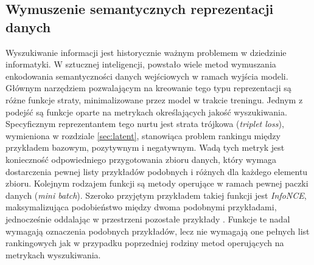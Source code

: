 \subsection{Wymuszenie semantycznych reprezentacji danych}
Wyszukiwanie informacji jest historycznie ważnym problemem w dziedzinie informatyki. W sztucznej inteligencji, powstało wiele metod wymuszania enkodowania semantyczności danych wejściowych w ramach wyjścia modeli. Głównym narzędziem pozwalającym na kreowanie tego typu reprezentacji są różne funkcje straty, minimalizowane przez model w trakcie treningu. Jednym z podejść są funkcje oparte na metrykach określających jakość wyszukiwania. Specyficznym reprezentantem tego nurtu jest strata trójkowa (\textit{triplet loss}), wymieniona w rozdziale \ref{sec:latent}, stanowiąca problem rankingu między przykładem bazowym, pozytywnym i negatywnym. Wadą tych metryk jest konieczność odpowiedniego przygotowania zbioru danych, który wymaga dostarczenia pewnej listy przykładów podobnych i różnych dla każdego elementu zbioru. Kolejnym rodzajem funkcji są metody operujące w ramach pewnej paczki danych (\textit{mini batch}). Szeroko przyjętym przykładem takiej funkcji jest \textit{InfoNCE}, maksymalizująca podobieństwo między dwoma podobnymi przykładami, jednocześnie oddalając w przestrzeni pozostałe przykłady \cite{oord2018cpc}. Funkcje te nadal wymagają oznaczenia podobnych przykładów, lecz nie wymagają one pełnych list rankingowych jak w przypadku poprzedniej rodziny metod operujących na metrykach wyszukiwania.

